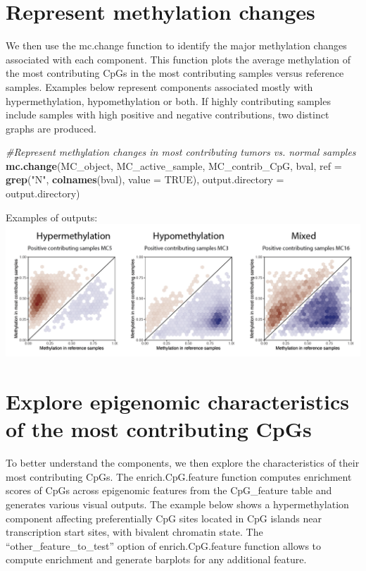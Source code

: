 \documentclass[]{article}
\newenvironment{Shaded}{\begin{snugshade}}{\end{snugshade}}
\newcommand{\CommentTok}[1]{\textcolor[rgb]{0.56,0.35,0.01}{\textit{#1}}}
\newcommand{\DataTypeTok}[1]{\textcolor[rgb]{0.13,0.29,0.53}{#1}}
\newcommand{\KeywordTok}[1]{\textcolor[rgb]{0.13,0.29,0.53}{\textbf{#1}}}
\newcommand{\NormalTok}[1]{#1}
\newcommand{\OtherTok}[1]{\textcolor[rgb]{0.56,0.35,0.01}{#1}}
\newcommand{\StringTok}[1]{\textcolor[rgb]{0.31,0.60,0.02}{#1}}
\begin{document}
\hypertarget{represent-methylation-changes}{%
\section{Represent methylation
changes}\label{represent-methylation-changes}}

We then use the mc.change function to identify the major methylation
changes associated with each component. This function plots the average
methylation of the most contributing CpGs in the most contributing
samples versus reference samples. Examples below represent components
associated mostly with hypermethylation, hypomethylation or both. If
highly contributing samples include samples with high positive and
negative contributions, two distinct graphs are produced.

\begin{Shaded}
\begin{Highlighting}[]
\CommentTok{#Represent methylation changes in most contributing tumors vs. normal samples}
\KeywordTok{mc.change}\NormalTok{(MC_object, MC_active_sample, MC_contrib_CpG, bval, }\DataTypeTok{ref =} \KeywordTok{grep}\NormalTok{(}\StringTok{"N"}\NormalTok{, }\KeywordTok{colnames}\NormalTok{(bval), }\DataTypeTok{value =} \OtherTok{TRUE}\NormalTok{), }\DataTypeTok{output.directory =}\NormalTok{ output.directory)}
\end{Highlighting}
\end{Shaded}

Examples of outputs:
\includegraphics[width=1\textwidth,height=1\textheight]{./meth_change.png}

\hypertarget{explore-epigenomic-characteristics-of-the-most-contributing-cpgs}{%
\section{Explore epigenomic characteristics of the most contributing
CpGs}\label{explore-epigenomic-characteristics-of-the-most-contributing-cpgs}}

To better understand the components, we then explore the characteristics
of their most contributing CpGs. The enrich.CpG.feature function
computes enrichment scores of CpGs across epigenomic features from the
CpG\_feature table and generates various visual outputs. The example
below shows a hypermethylation component affecting preferentially CpG
sites located in CpG islands near transcription start sites, with
bivalent chromatin state. The ``other\_feature\_to\_test'' option of
enrich.CpG.feature function allows to compute enrichment and generate
barplots for any additional feature.
\end{document}
